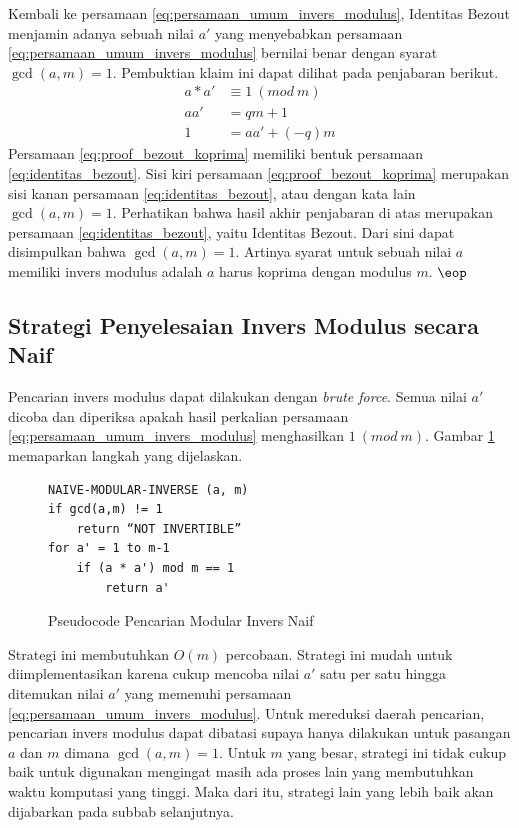Kembali ke persamaan \eqref{eq:persamaan_umum_invers_modulus}, Identitas Bezout menjamin adanya sebuah nilai $ a' $ yang menyebabkan persamaan \eqref{eq:persamaan_umum_invers_modulus} bernilai benar dengan syarat $ \gcd (a,m) = 1 $. Pembuktian klaim ini dapat dilihat pada penjabaran berikut.
\begin{align}
a * a' &\equiv 1\ (mod\ m) \\
aa' &= qm + 1 \\
1 &= aa' + (-q)m
\label{eq:proof_bezout_koprima}
\end{align}
Persamaan \eqref{eq:proof_bezout_koprima} memiliki bentuk persamaan \eqref{eq:identitas_bezout}. Sisi kiri persamaan \eqref{eq:proof_bezout_koprima} merupakan sisi kanan persamaan \eqref{eq:identitas_bezout}, atau dengan kata lain $ \gcd (a, m) = 1 $. Perhatikan bahwa hasil akhir penjabaran di atas merupakan persamaan \eqref{eq:identitas_bezout}, yaitu Identitas Bezout. Dari sini dapat disimpulkan bahwa $ \gcd (a, m)=1 $. Artinya syarat untuk sebuah nilai $ a $ memiliki invers modulus adalah $ a $ harus koprima dengan modulus $ m $. \hfill $ \eop $

\subsection{ Strategi Penyelesaian Invers Modulus secara Naif}

Pencarian invers modulus dapat dilakukan dengan \textit{brute force}. Semua nilai $ a' $ dicoba dan diperiksa apakah hasil perkalian persamaan \eqref{eq:persamaan_umum_invers_modulus} menghasilkan $ 1\ (mod\ m) $. Gambar \ref{psdo:modinv_naive} memaparkan langkah yang dijelaskan.
\begin{figure}[h!]
\begin{lstlisting}[firstnumber=0]
NAIVE-MODULAR-INVERSE (a, m)
if gcd(a,m) != 1
	return “NOT INVERTIBLE”
for a' = 1 to m-1
	if (a * a') mod m == 1
		return a'
\end{lstlisting}
\caption{Pseudocode Pencarian Modular Invers Naif}
\label{psdo:modinv_naive}
\end{figure}

Strategi ini membutuhkan $ O(m) $ percobaan. Strategi ini mudah untuk diimplementasikan karena cukup mencoba nilai $ a' $ satu per satu hingga ditemukan nilai $ a' $ yang memenuhi persamaan \eqref{eq:persamaan_umum_invers_modulus}. Untuk mereduksi daerah pencarian, pencarian invers modulus dapat dibatasi supaya hanya dilakukan untuk pasangan $ a $ dan $ m $ dimana $ \gcd⁡(a, m)= 1 $. Untuk $ m $ yang besar, strategi ini tidak cukup baik untuk digunakan mengingat masih ada proses lain yang membutuhkan waktu komputasi yang tinggi. Maka dari itu, strategi lain yang lebih baik akan dijabarkan pada subbab selanjutnya.

